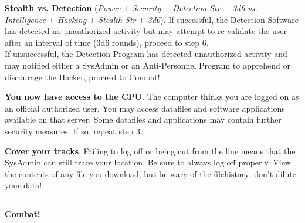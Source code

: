 \documentclass[11pt,twoside,a4paper]{article}
\newenvironment{local_enumerate}{
\begin{enumerate}
     \setlength{\itemsep}{1pt}
     \setlength{\parskip}{0pt}
     \setlength{\parsep}{0pt}}
{\end{enumerate}
}
\begin{document}
\begin{local_enumerate}
	\item \textbf{Stealth vs. Detection} (\emph{Power} + \emph{Security} + \emph{Detection Str} + \emph{3d6 vs. Intelligence} + \emph{Hacking} + \emph{Stealth Str} + \emph{3d6}). If successful, the Detection Software has detected no unauthorized activity but may attempt to re-validate the user after an interval of time (3d6 rounds), proceed to step 6. ~\\
		If unsuccessful, the Detection Program has detected unauthorized activity and may notified either a SysAdmin or an Anti-Personnel Program to apprehend or discourage the Hacker, proceed to Combat!
	\item \textbf{You now have access to the CPU}. The computer thinks you are logged on as an official authorized user. You may access datafiles and software applications available on that server. Some datafiles and applications may contain further security measures. If so, repeat step 3.
	\item \textbf{Cover your tracks}. Failing to log off or being cut from the line means that the SysAdmin can still trace your location. Be sure to always log off properly. View the contents of any file you download, but be wary of the filehistory: don't dilute your data!
\end{local_enumerate} %

\begin{center} \rule{0.85\textwidth}{0.01cm} \end{center}

\textbf{\underline{\large Combat!}} %
\end{document}
